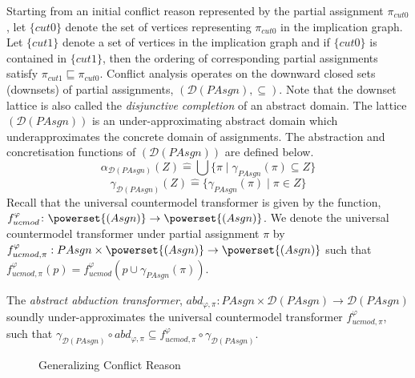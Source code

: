 Starting from an initial conflict reason represented by the partial assignment
$\pi_{cut0}$, let $\{cut0\}$ denote the set of vertices representing
$\pi_{cut0}$ in the implication graph.  Let $\{cut1\}$ denote a set of vertices 
in the implication graph and if $\{cut0\}$ is contained in $\{cut1\}$, then the
ordering of corresponding partial assignments satisfy $\pi_{cut1} \sqsubseteq
\pi_{cut0}$.  Conflict analysis operates on the downward closed sets 
(downsets) of partial assignments, $(\mathcal{D}(PAsgn), \subseteq)$. 
Note that the downset lattice is also called the \emph{disjunctive completion} of 
an abstract domain. 
The lattice $(\mathcal{D}(PAsgn))$ is an under-approximating abstract domain
which underapproximates the concrete domain of assignments.  The abstraction and
concretisation functions of $(\mathcal{D}(PAsgn))$ are defined below. 
\begin{equation*}
  \alpha_{\mathcal{D}(PAsgn)}(Z) \mathrel{\hat=} \bigcup \{\pi \mid 
  \gamma_{PAsgn}(\pi) \subseteq Z \}
\end{equation*}
%
\begin{equation*}
  \gamma_{\mathcal{D}(PAsgn)}(Z) \mathrel{\hat=} \{ 
  \gamma_{PAsgn}(\pi) \mid \pi \in Z \}
\end{equation*}
%
Recall that the universal countermodel transformer is given by the function, 
$f_{ucmod}^\varphi \colon \powerset{(Asgn)} \rightarrow \powerset{(Asgn)}$.  
We denote the universal countermodel transformer under partial assignment $\pi$ by
$f_{ucmod,\pi}^\varphi : PAsgn \times \powerset{(Asgn)} \rightarrow
\powerset{(Asgn)}$ such that $f_{ucmod,\pi}^\varphi(p) = f_{ucmod}^\varphi(p
\cup \gamma_{PAsgn}(\pi))$.

The \emph{abstract abduction transformer}, $abd_{\varphi,\pi} \colon PAsgn
\times \mathcal{D}(PAsgn) \rightarrow \mathcal{D}(PAsgn) $ soundly 
under-approximates the universal countermodel transformer 
$f_{ucmod, \pi}^\varphi$, such that 
$\gamma_{\mathcal{D}(PAsgn)} \circ abd_{\varphi,\pi} \subseteq 
f_{ucmod, \pi}^\varphi \circ \gamma_{\mathcal{D}(PAsgn)}$.
%
\begin{figure}[htbp]
\centering
\vspace*{-0.2cm}
\caption{Generalizing Conflict Reason \label{conflict}}
\end{figure}
%

